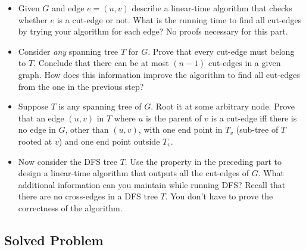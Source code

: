 \documentclass[11pt]{article}
\begin{document}
\begin{enumerate}
\begin{itemize}
  \item Given $G$ and edge $e=(u,v)$ describe a linear-time algorithm
    that checks whether $e$ is a cut-edge or not. What is the running time
    to find all cut-edges by trying your algorithm for each edge? No proofs
    necessary for this part.
  \item Consider {\em any} spanning tree $T$ for $G$. Prove that every
    cut-edge must belong to $T$. Conclude that there can be at most $(n-1)$
    cut-edges in a given graph. How does this information improve the
    algorithm to find all cut-edges from the one in the previous step?
  \item Suppose $T$ is any spanning tree of $G$. Root it at some
    arbitrary node.  Prove that an edge $(u,v)$ in $T$ where $u$ is
    the parent of $v$ is a cut-edge iff there is no edge in $G$, other
    than $(u,v)$, with one end point in $T_v$ (sub-tree of $T$ rooted
    at $v$) and one end point outside $T_v$.
  \item Now consider the DFS tree $T$.  Use the property in the
    preceding part to design a linear-time algorithm that outputs all
    the cut-edges of $G$. What additional information can you maintain
    while running DFS? Recall that there are no cross-edges in a DFS
    tree $T$. You don't have to prove the correctness of
    the algorithm.
  \end{itemize}


\end{enumerate}
\vspace{1in}

\subsection*{Solved Problem}
\end{document}
